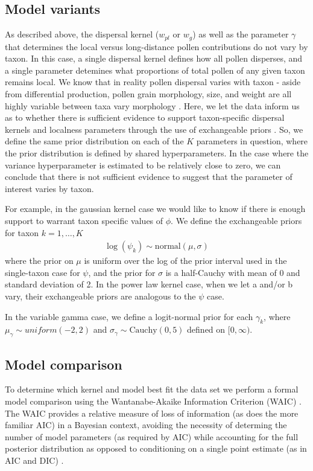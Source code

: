 \documentclass[12pt]{article}
\begin{document}
\subsection{Model variants}

As described above, the dispersal kernel ($w_{pl}$ or $w_g$) as well
as the parameter $\gamma$ that determines the local versus
long-distance pollen contributions do not vary by taxon. In this case,
a single dispersal kernel defines how all pollen disperses, and a
single parameter detemines what proportions of total pollen of any
given taxon remains local. We know that in reality pollen dispersal
varies with taxon - aside from differential production, pollen grain
morphology, size, and weight are all highly variable between taxa vary
morphology \cite{XXX}. Here, we let the data inform us as to whether
there is sufficient evidence to support taxon-specific dispersal
kernels and localness parameters through the use of exchangeable
priors \cite{XXX}. So, we define the same prior distribution on each of the $K$
parameters in question, where the prior distribution is defined by
shared hyperparameters. In the case where the variance hyperparameter
is estimated to be relatively close to zero, we can conclude that
there is not sufficient evidence to suggest that the parameter of
interest varies by taxon.

For example, in the gaussian kernel case we would like to know
if there is enough support to warrant taxon specific values of
$\phi$. We define the exchangeable priors for taxon $k=1, \ldots, K$
\begin{align}
\log(\psi_k) \sim \text{normal}( \mu, \sigma)
\end{align}
where the prior on $\mu$ is uniform over the log of the prior interval
used in the single-taxon case for $\psi$, and the prior for $\sigma$
is a half-Cauchy with mean of 0 and standard deviation of 2. In the
power law kernel case, when we let a and/or b vary, their exchangeable
priors are analogous to the $\psi$ case.

In the variable gamma case, we define a logit-normal prior for each
$\gamma_k$, where $\mu_{\gamma} \sim uniform(-2, 2)$ and $\sigma_{\gamma}
\sim \text{Cauchy}(0,5)$ defined on $[0,\infty)$.

\subsection{Model comparison}

To determine which kernel and model best fit the data set we perform a
formal model comparison using the Wantanabe-Akaike Information
Criterion (WAIC) \cite{XXX}. The WAIC provides a relative measure of
loss of information (as does the more familiar AIC) in a Bayesian
context, avoiding the necessity of determing the number of model
parameters (as required by AIC) while accounting for the full
posterior distribution as opposed to conditioning on a single point
estimate (as in AIC and DIC) \cite{XXX}. 
\end{document}

